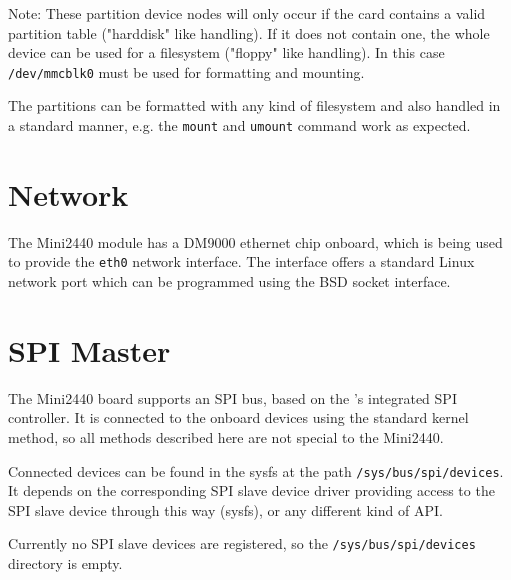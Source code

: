 Note: These partition device nodes will only occur if the card contains a
valid partition table ("harddisk" like handling). If it does not contain one,
the whole device can be used for a filesystem ("floppy" like handling). In
this case \texttt{/dev/mmcblk0} must be used for formatting and mounting.

The partitions can be formatted with any kind of filesystem and also handled in
a standard manner, e.g. the \texttt{mount} and \texttt{umount} command work as
expected.


\newcommand{\perNetworkChip}{ DM9000}
\newcommand{\perNetworkInterface}{eth0}

\section{Network}				\label{sec:NET}

The Mini2440 module has a\perNetworkChip{} ethernet chip onboard,
which is being used to provide the \texttt{\perNetworkInterface{}} network
interface. The interface offers a standard Linux network port which can be
programmed using the BSD socket interface.


\section{SPI Master}				\label{sec:SPI}

The Mini2440 board supports an SPI bus, based on the \perCpuName 's
integrated SPI controller. It is connected to the onboard devices using the
standard kernel method, so all methods described here are not special to the
Mini2440.

Connected devices can be found in the sysfs at the path
\texttt{/sys/bus/spi/devices}. It depends on the corresponding SPI slave device
driver providing access to the SPI slave device through this way (sysfs),
or any different kind of API.

\begin{important}
Currently no SPI slave devices are registered, so the
\texttt{/sys/bus/spi/devices} directory is empty.
\end{important}

%
%

